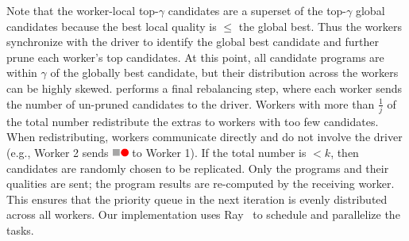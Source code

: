 Note that the worker-local top-$\gamma$ candidates are a superset of the top-$\gamma$ global candidates because the best local quality is $\le$ the global best.   Thus the workers synchronize with the driver to identify the global best candidate and further prune each worker's top candidates.  At this point, all candidate programs are within $\gamma$ of the globally best candidate, but their distribution across the workers can be highly skewed.  \sys performs a final rebalancing step, where each worker sends the number of un-pruned candidates to the driver.  Workers with more than $\frac{1}{j}$ of the total number redistribute the extras to workers with too few candidates.  When redistributing, workers communicate directly and do not involve the driver (e.g., Worker 2 sends \includegraphics[height=8pt]{figures/program-greyred.pdf} to Worker 1).   If the total number is $<k$, then candidates are randomly chosen to be replicated.  Only the programs and their qualities are sent; the program results are re-computed by the receiving worker.  This ensures that the priority queue in the next iteration is evenly distributed across all workers.
Our implementation uses Ray~\cite{ray} to schedule and parallelize the tasks.


